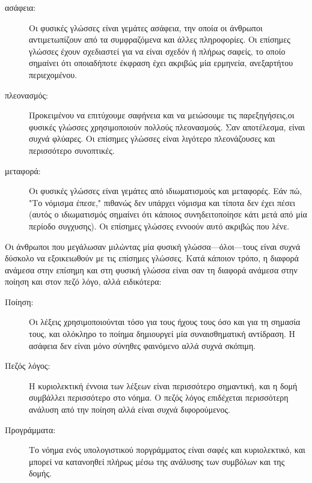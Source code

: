 \documentclass[10pt]{book}
\begin{document}
\begin{description}

\item[ασάφεια:] Οι φυσικές γλώσσες είναι γεμάτες ασάφεια, την οποία
οι άνθρωποι αντιμετωπίζουν από τα συμφραζόμενα και άλλες πληροφορίες.
Οι επίσημες γλώσσες έχουν σχεδιαστεί για να είναι σχεδόν ή πλήρως σαφείς,
το οποίο σημαίνει ότι οποιαδήποτε έκφραση έχει ακριβώς μία ερμηνεία,
ανεξαρτήτου περιεχομένου.

\item[πλεονασμός:] Προκειμένου να επιτύχουμε σαφήνεια και να μειώσουμε
τις παρεξηγήσεις,οι φυσικές γλώσσες χρησιμοποιούν πολλούς πλεονασμούς.
Σαν αποτέλεσμα, είναι συχνά φλύαρες. Οι επίσημες γλώσσες είναι λιγότερο
πλεονάζουσες και περισσότερο συνοπτικές.

\item[μεταφορά:] Οι φυσικές γλώσσες είναι γεμάτες από ιδιωματισμούς
και μεταφορές. Εάν πώ, "Το νόμισμα έπεσε," πιθανώς δεν υπάρχει νόμισμα
και τίποτα δεν έχει πέσει (αυτός ο ιδιωματισμός σημαίνει ότι κάποιος
συνηδειτοποίησε κάτι μετά από μία περίοδο συγχυσης). Οι επίσημες γλώσσες
εννοούν αυτό ακριβώς που λένε.

\end{description}

Οι άνθρωποι που μεγάλωσαν μιλώντας μία φυσική γλώσσα---όλοι---τους είναι
συχνά δύσκολο να εξοικειωθούν με τις επίσημες γλώσσες. Κατά κάποιον τρόπο,
η διαφορά ανάμεσα στην επίσημη και στη φυσική γλώσσα είναι σαν τη διαφορά
ανάμεσα στην ποίηση και στον πεζό λόγο, αλλά ειδικότερα:

\begin{description}

\item[Ποίηση:] Οι λέξεις χρησιμοποιούνται τόσο για τους ήχους τους
όσο και για τη σημασία τους, και ολόκληρο το ποίημα δημιουργεί μία
συναισθηματική αντίδραση. Η ασάφεια δεν είναι μόνο σύνηθες φαινόμενο
αλλά συχνά σκόπιμη.

\item[Πεζός λόγος:] Η κυριολεκτική έννοια των λέξεων είναι περισσότερο
σημαντική, και η δομή συμβάλλει περισσότερο στο νόημα. Ο πεζός λόγος
επιδέχεται περισσότερη ανάλυση από την ποίηση αλλά είναι συχνά
διφορούμενος.

\item[Προγράμματα:] Το νόημα ενός υπολογιστικού ποργράμματος είναι
σαφές και κυριολεκτικό, και μπορεί να κατανοηθεί πλήρως μέσω της ανάλυσης
των συμβόλων και της δομής.

\end{description}
\end{document}
